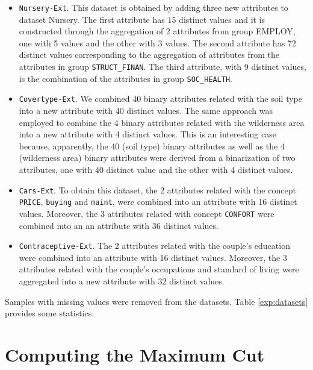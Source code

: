 \begin{itemize}

\item {\tt Nursery-Ext}. This dataset is obtained by adding three
new attributes to dataset Nursery. 
The first attribute has  $15$ distinct values
and it is constructed through the  aggregation of   2 attributes 
from group  EMPLOY, one with 5 values and the other with 3 values. 
The second attribute has 72 distinct values
corresponding to the aggregation of attributes from 
the attributes in group {\tt STRUCT\_FINAN}.
The third attribute, with 9 distinct values, is the combination of
the  attributes in group {\tt SOC\_HEALTH}.


\item {\tt Covertype-Ext}. 
We combined 40 binary attributes
related with the soil type  into a new attribute with 40 distinct values.
The same approach was employed to combine the 4 binary attributes related
with the wilderness area into a new attribute
with 4 distinct values.
This is an interesting case because, apparently, the 40 (soil type)
binary attributes  as well as the 4 (wilderness area) binary attributes
 were derived from a binarization of two attributes, one with 40 distinct value and the other with 4 distinct values.
 

\item {\tt Cars-Ext}. To obtain this dataset, the 2 attributes
related with the concept {\tt PRICE},  {\tt buying} and {\tt maint},
were combined into an attribute
with 16 distinct values.
Moreover, the 3 attributes
related with concept {\tt CONFORT} were  combined into an 
an attribute with 36 distinct values.

\item {\tt Contraceptive-Ext}. The 2 attributes
related with the couple's education were combined into an
attribute with 16 distinct values.
Moreover, the 3 attributes related with the couple's occupations  and  standard of living
were  aggregated into a new attribute with 32 distinct values.

\end{itemize}

Samples with missing values were removed from the datasets.
Table \ref{exp:datasets} provides some statistics.




\section{Computing the Maximum Cut}
 

